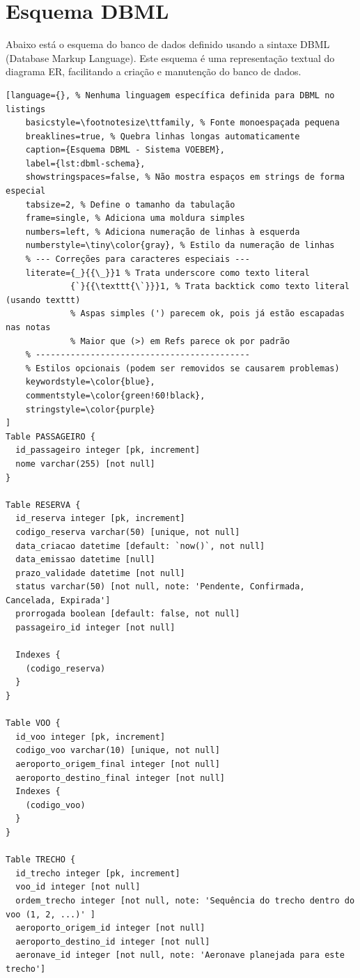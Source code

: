 \section*{Esquema DBML}

Abaixo está o esquema do banco de dados definido usando a sintaxe DBML (Database Markup Language). Este esquema é uma representação textual do diagrama ER, facilitando a criação e manutenção do banco de dados.

\begin{lstlisting}[language={}, % Nenhuma linguagem específica definida para DBML no listings
    basicstyle=\footnotesize\ttfamily, % Fonte monoespaçada pequena
    breaklines=true, % Quebra linhas longas automaticamente
    caption={Esquema DBML - Sistema VOEBEM},
    label={lst:dbml-schema},
    showstringspaces=false, % Não mostra espaços em strings de forma especial
    tabsize=2, % Define o tamanho da tabulação
    frame=single, % Adiciona uma moldura simples
    numbers=left, % Adiciona numeração de linhas à esquerda
    numberstyle=\tiny\color{gray}, % Estilo da numeração de linhas
    % --- Correções para caracteres especiais --- 
    literate={_}{{\_}}1 % Trata underscore como texto literal
             {`}{{\texttt{\`}}}1, % Trata backtick como texto literal (usando texttt)
             % Aspas simples (') parecem ok, pois já estão escapadas nas notas
             % Maior que (>) em Refs parece ok por padrão
    % -------------------------------------------
    % Estilos opcionais (podem ser removidos se causarem problemas)
    keywordstyle=\color{blue}, 
    commentstyle=\color{green!60!black}, 
    stringstyle=\color{purple}
]
Table PASSAGEIRO {
  id_passageiro integer [pk, increment]
  nome varchar(255) [not null]
}

Table RESERVA {
  id_reserva integer [pk, increment]
  codigo_reserva varchar(50) [unique, not null]
  data_criacao datetime [default: `now()`, not null]
  data_emissao datetime [null]
  prazo_validade datetime [not null]
  status varchar(50) [not null, note: 'Pendente, Confirmada, Cancelada, Expirada']
  prorrogada boolean [default: false, not null]
  passageiro_id integer [not null]

  Indexes {
    (codigo_reserva)
  }
}

Table VOO {
  id_voo integer [pk, increment]
  codigo_voo varchar(10) [unique, not null]
  aeroporto_origem_final integer [not null]
  aeroporto_destino_final integer [not null]
  Indexes {
    (codigo_voo)
  }
}

Table TRECHO {
  id_trecho integer [pk, increment]
  voo_id integer [not null]
  ordem_trecho integer [not null, note: 'Sequência do trecho dentro do voo (1, 2, ...)' ]
  aeroporto_origem_id integer [not null]
  aeroporto_destino_id integer [not null]
  aeronave_id integer [not null, note: 'Aeronave planejada para este trecho']


\end{lstlisting}
